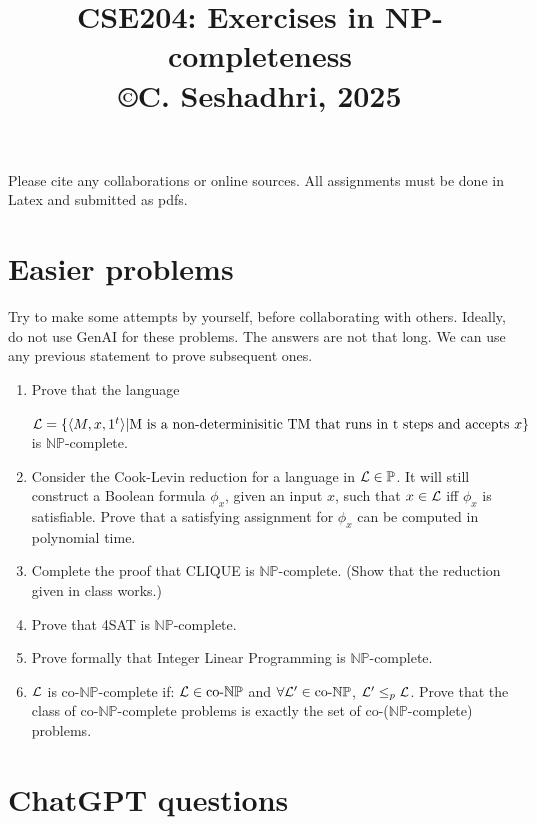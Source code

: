 \documentclass[11pt]{article}
\title{CSE204: Exercises in NP-completeness\\
{\small \copyright C. Seshadhri, 2025}}
\date{}
\theoremstyle{definition}
\newcommand{\PTIME}{\mathbb{P}}
\newcommand{\cL}{{\cal L}}
\newcommand{\NP}{\mathbb{NP}}
\newcommand{\coNP}{\textrm{co-}\mathbb{NP}}
\begin{document}
\maketitle

Please cite any collaborations
or online sources. All assignments must be done in Latex and submitted as pdfs.

\section{Easier problems}

Try to make some attempts by yourself, before collaborating with others. Ideally, do not use GenAI for these
problems. The answers are not that long. We can use any previous statement to prove subsequent ones.

\begin{enumerate}

    \item Prove that the language

    $\cL = \{\langle M, x, 1^t\rangle | \textrm{M is a non-determinisitic TM
     that runs in t steps and accepts $x$}\}$ is $\NP$-complete.

    \item Consider the Cook-Levin reduction for a language in $\cL \in \PTIME$. It will still construct a Boolean formula
        $\phi_x$, given an input $x$, such that $x \in \cL$ iff $\phi_x$ is satisfiable. Prove that a satisfying assignment
        for $\phi_x$ can be computed in polynomial time.

    \item Complete the proof that CLIQUE is $\NP$-complete. (Show that the reduction given in class works.)

    \item Prove that 4SAT is $\NP$-complete. 

    \item Prove formally that Integer Linear Programming is $\NP$-complete.

    \item $\cL$ is $\coNP$-complete if: $\cL \in \coNP$ and $\forall \cL' \in \coNP$, $\cL' \leq_p \cL$.
    Prove that the class of $\coNP$-complete problems is exactly the set of co-($\NP$-complete) problems.

\end{enumerate}


\section{ChatGPT questions} 
\end{document}
